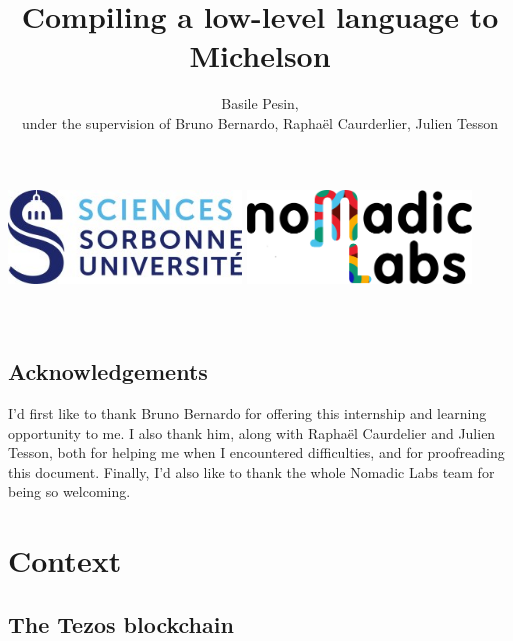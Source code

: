 \documentclass{report}
\title{Compiling a low-level language to Michelson}
\author{Basile Pesin,\\
  under the supervision of Bruno Bernardo, Raphaël Caurderlier, Julien Tesson}
\begin{document}
\makeatletter
    \begin{titlepage}
        \begin{center}
            \includegraphics[height=2.5cm]{ressources/su.jpg}
            \hspace{2cm}
            \includegraphics[height=2.5cm]{ressources/nomadic.png}\\[35ex]
            {\huge \bfseries  \@title }\\[10ex]
            {\large \@author}\\[40ex]
            {\large \@date}
        \end{center}
    \end{titlepage}
\makeatother

\vspace*{\fill}
\begin{center}
\section*{Acknowledgements}
I'd first like to thank Bruno Bernardo for offering this internship and learning opportunity to me. I also thank him, along with Raphaël Caurdelier and Julien Tesson, both for helping me when I encountered difficulties, and for proofreading this document. Finally, I'd also like to thank the whole Nomadic Labs team for being so welcoming.
\end{center}
\vspace*{\fill}

\tableofcontents

\chapter*{Context}

\section{The Tezos blockchain}
\end{document}
